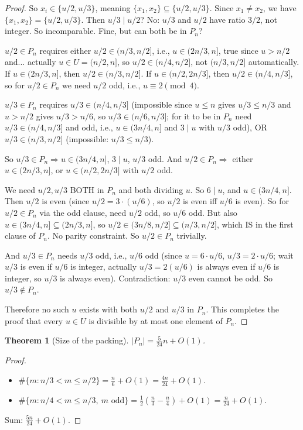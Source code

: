 \documentclass{article}
\newtheorem{theorem}{Theorem}
\begin{document}
\begin{proof}
So $x_i \in \{u/2, u/3\}$, meaning $\{x_1, x_2\} \subseteq \{u/2, u/3\}$. Since $x_1 \ne x_2$, we have $\{x_1, x_2\} = \{u/2, u/3\}$. Then $u/3 \mid u/2$? No: $u/3$ and $u/2$ have ratio $3/2$, not integer. So incomparable. Fine, but can both be in $P_n$?

$u/2 \in P_n$ requires either $u/2 \in (n/3, n/2]$, i.e., $u \in (2n/3, n]$, true since $u > n/2$ and... actually $u \in U = (n/2, n]$, so $u/2 \in (n/4, n/2]$, not $(n/3, n/2]$ automatically. If $u \in (2n/3, n]$, then $u/2 \in (n/3, n/2]$. If $u \in (n/2, 2n/3]$, then $u/2 \in (n/4, n/3]$, so for $u/2 \in P_n$ we need $u/2$ odd, i.e., $u \equiv 2 \pmod 4$.

$u/3 \in P_n$ requires $u/3 \in (n/4, n/3]$ (impossible since $u \le n$ gives $u/3 \le n/3$ and $u > n/2$ gives $u/3 > n/6$, so $u/3 \in (n/6, n/3]$; for it to be in $P_n$ need $u/3 \in (n/4, n/3]$ and odd, i.e., $u \in (3n/4, n]$ and $3 \mid u$ with $u/3$ odd), OR $u/3 \in (n/3, n/2]$ (impossible: $u/3 \le n/3$).

So $u/3 \in P_n \Rightarrow u \in (3n/4, n]$, $3 \mid u$, $u/3$ odd. And $u/2 \in P_n \Rightarrow$ either $u \in (2n/3, n]$, or $u \in (n/2, 2n/3]$ with $u/2$ odd.

We need $u/2, u/3$ BOTH in $P_n$ and both dividing $u$. So $6 \mid u$, and $u \in (3n/4, n]$. Then $u/2$ is even (since $u/2 = 3 \cdot (u/6)$, so $u/2$ is even iff $u/6$ is even). So for $u/2 \in P_n$ via the odd clause, need $u/2$ odd, so $u/6$ odd. But also $u \in (3n/4, n] \subseteq (2n/3, n]$, so $u/2 \in (3n/8, n/2] \subseteq (n/3, n/2]$, which IS in the first clause of $P_n$. No parity constraint. So $u/2 \in P_n$ trivially.

And $u/3 \in P_n$ needs $u/3$ odd, i.e., $u/6$ odd (since $u = 6 \cdot u/6$, $u/3 = 2 \cdot u/6$; wait $u/3$ is even if $u/6$ is integer, actually $u/3 = 2 (u/6)$ is always even if $u/6$ is integer, so $u/3$ is always even). Contradiction: $u/3$ even cannot be odd. So $u/3 \notin P_n$.

Therefore no such $u$ exists with both $u/2$ and $u/3$ in $P_n$. This completes the proof that every $u \in U$ is divisible by at most one element of $P_n$.
\end{proof}

\begin{theorem}[Size of the packing]
$|P_n| = \frac{5}{24}n + O(1)$.
\end{theorem}

\begin{proof}
\begin{itemize}
\item $\#\{m : n/3 < m \le n/2\} = \frac{n}{6} + O(1) = \frac{4n}{24} + O(1)$.
\item $\#\{m : n/4 < m \le n/3,\ m \text{ odd}\} = \frac{1}{2}(\frac{n}{3} - \frac{n}{4}) + O(1) = \frac{n}{24} + O(1)$.
\end{itemize}
Sum: $\frac{5n}{24} + O(1)$.
\end{proof}
\end{document}
